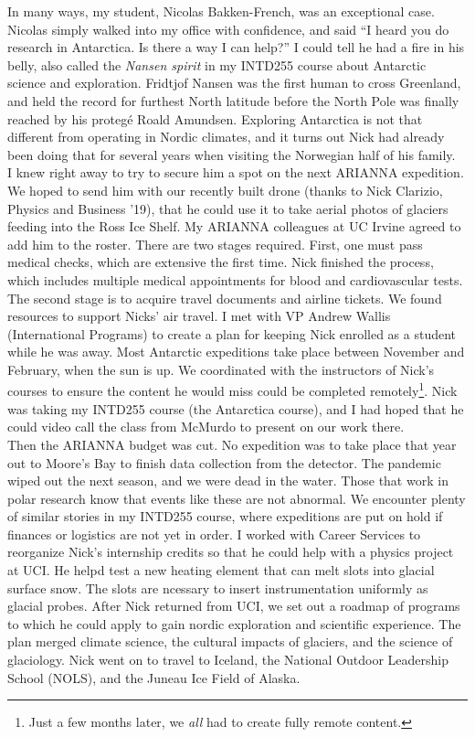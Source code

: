 \documentclass[../../../main.tex]{subfiles}
\begin{document}
In many ways, my student, Nicolas Bakken-French, was an exceptional case.  Nicolas simply walked into my office with confidence, and said ``I heard you do research in Antarctica.  Is there a way I can help?''  I could tell he had a fire in his belly, also called the \textit{Nansen spirit} in my INTD255 course about Antarctic science and exploration.  Fridtjof Nansen was the first human to cross Greenland, and held the record for furthest North latitude before the North Pole was finally reached by his proteg\'{e} Roald Amundsen.  Exploring Antarctica is not that different from operating in Nordic climates, and it turns out Nick had already been doing that for several years when visiting the Norwegian half of his family.
\\
\vspace{0.15cm}
I knew right away to try to secure him a spot on the next ARIANNA expedition.  We hoped to send him with our recently built drone (thanks to Nick Clarizio, Physics and Business '19), that he could use it to take aerial photos of glaciers feeding into the Ross Ice Shelf.  My ARIANNA colleagues at UC Irvine agreed to add him to the roster.  There are two stages required.  First, one must pass medical checks, which are extensive the first time.  Nick finished the process, which includes multiple medical appointments for blood and cardiovascular tests.  The second stage is to acquire travel documents and airline tickets.  We found resources to support Nicks' air travel.  I met with VP Andrew Wallis (International Programs) to create a plan for keeping Nick enrolled as a student while he was away.  Most Antarctic expeditions take place between November and February, when the sun is up.  We coordinated with the instructors of Nick's courses to ensure the content he would miss could be completed remotely\footnote{Just a few months later, we \textit{all} had to create fully remote content.}.  Nick was taking my INTD255 course (the Antarctica course), and I had hoped that he could video call the class from McMurdo to present on our work there.
\\
\vspace{0.15cm}
Then the ARIANNA budget was cut.  No expedition was to take place that year out to Moore's Bay to finish data collection from the detector.  The pandemic wiped out the next season, and we were dead in the water.  Those that work in polar research know that events like these are not abnormal.  We encounter plenty of similar stories in my INTD255 course, where expeditions are put on hold if finances or logistics are not yet in order.  I worked with Career Services to reorganize Nick's internship credits so that he could help with a physics project at UCI.  He helpd test a new heating element that can melt slots into glacial surface snow.  The slots are ncessary to insert instrumentation uniformly as glacial probes.  After Nick returned from UCI, we set out a roadmap of programs to which he could apply to gain nordic exploration and scientific experience.  The plan merged climate science, the cultural impacts of glaciers, and the science of glaciology.  Nick went on to travel to Iceland, the National Outdoor Leadership School (NOLS), and the Juneau Ice Field of Alaska.
\end{document}
